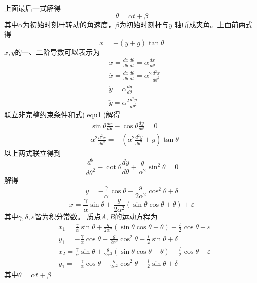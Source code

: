 \documentclass[10pt,a4paper]{article}
\begin{document}
上面最后一式解得
\[
\theta=\alpha t+\beta
\]
其中$\alpha$为初始时刻杆转动的角速度，$\beta$为初始时刻杆与$y$ 轴所成夹角。上面前两式得
\begin{equation}
\label{equ1}
\ddot{x}=-(\ddot{y}+g)\tan\theta
\end{equation}
$x,y$的一、二阶导数可以表示为
\begin{align*}
&\dot{x}=\frac{dx}{d\theta}\frac{d\theta}{dt}=\alpha\frac{dx}{d\theta}\\
&\ddot{x}=\frac{d\dot{x}}{d\theta}\frac{d\theta}{dt}=\alpha^2\frac{d^2x}{d\theta^2}\\
&\dot{y}=\alpha\frac{dy}{d\theta}\\
&\ddot{y}=\alpha^2\frac{d^2y}{d\theta^2}
\end{align*}
联立非完整约束条件和式(\ref{equ1})解得
\begin{align*}
&\sin\theta\frac{dx}{d\theta}-\cos\theta\frac{dy}{d\theta}=0\\
&\alpha^2\frac{d^2x}{d\theta^2}=-(\alpha^2\frac{d^2y}{d\theta^2}+g)\tan\theta
\end{align*}
以上两式联立得到
\[
\frac{d^y}{d\theta^2}-\cot\theta\frac{dy}{d\theta}+\frac{g}{\alpha^2}\sin^2\theta=0
\]
解得
\[
y=-\frac{\gamma}{\alpha}\cos\theta-\frac{g}{2\alpha^2}\cos^2\theta+\delta
\]
\[
x=\frac{\gamma}{\alpha}\sin\theta+\frac{g}{2\alpha^2}(\sin\theta\cos\theta+\theta)+\varepsilon
\]
其中$\gamma,\delta,\varepsilon$皆为积分常数。
质点$A,B$的运动方程为
\begin{align*}
&x_1=\frac{\gamma}{\alpha}\sin\theta+\frac{g}{2\alpha^2}(\sin\theta\cos\theta+\theta)-\frac{l}{2}\cos\theta+\varepsilon\\
&y_1=-\frac{\gamma}{\alpha}\cos\theta-\frac{g}{2\alpha^2}\cos^2\theta-\frac{l}{2}\sin\theta+\delta\\
&x_2=\frac{\gamma}{\alpha}\sin\theta+\frac{g}{2\alpha^2}(\sin\theta\cos\theta+\theta)+\frac{l}{2}\cos\theta+\varepsilon\\
&y_1=-\frac{\gamma}{\alpha}\cos\theta-\frac{g}{2\alpha^2}\cos^2\theta+\frac{l}{2}\sin\theta+\delta
\end{align*}
其中$\theta=\alpha t+\beta$
\end{document}

